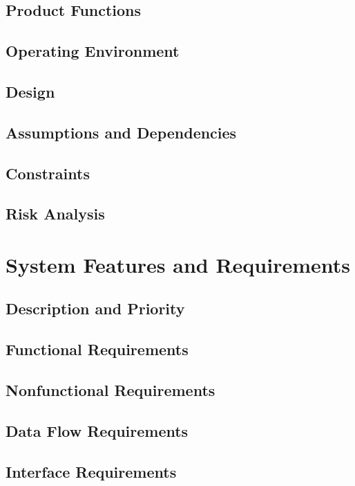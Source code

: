 \documentclass{scrreprt}
\begin{document}
\section{Product Functions}
    

\section{Operating Environment}

\section{Design}

\section{Assumptions and Dependencies}

\section{Constraints}

\section{Risk Analysis}



\chapter{System Features and Requirements}

\section{Description and Priority}


\section{Functional Requirements}

\section{Nonfunctional Requirements}
\section{Data Flow Requirements}
\section{Interface Requirements}
\end{document}
